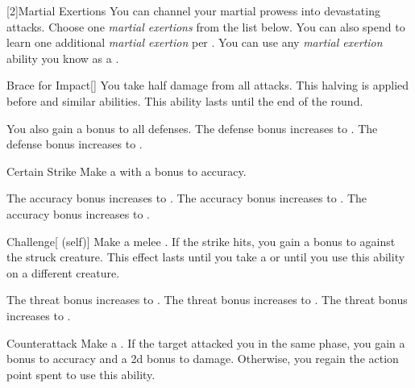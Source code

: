         [2]{Martial Exertions}
        You can channel your martial prowess into devastating attacks.
        Choose one \textit{martial exertions} from the list below.
        You can also spend  to learn one additional \textit{martial exertion} per .
        You can use any \textit{martial exertion} ability you know as a .
        {
            \begin{freeability}{Brace for Impact}[]
                You take half damage from all attacks.
                This halving is applied before  and similar abilities.
                This ability lasts until the end of the round.

                \rankline
                 You also gain a  bonus to all defenses.
                 The defense bonus increases to .
                 The defense bonus increases to .
            \end{freeability}

            \begin{apability}{Certain Strike}
                Make a  with a  bonus to accuracy.

                \rankline
                 The accuracy bonus increases to .
                 The accuracy bonus increases to .
                 The accuracy bonus increases to .
            \end{apability}

            \begin{freeability}{Challenge}[ (self)]
                Make a melee .
                If the strike hits, you gain a  bonus to  against the struck creature.
                This effect lasts until you take a  or until you use this ability on a different creature.

                \rankline
                 The threat bonus increases to .
                 The threat bonus increases to .
                 The threat bonus increases to .
            \end{freeability}

            \begin{apability}{Counterattack}
                Make a .
                If the target attacked you in the same phase, you gain a  bonus to accuracy and a \plus2d bonus to damage.
                Otherwise, you regain the action point spent to use this ability.


\end{apability}}
